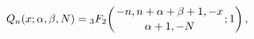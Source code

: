 \[\mathop{Q_{n}\/}\nolimits\!\left(x;\alpha,\beta,N\right)=\mathop{{{}_{3}F_{2}}%
\/}\nolimits\!\left({-n,n+\alpha+\beta+1,-x\atop\alpha+1,-N};1\right),\]